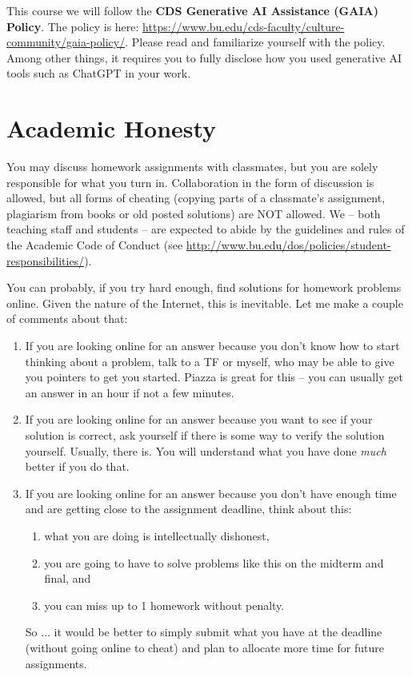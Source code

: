 \documentclass[11pt]{article}
\begin{document}
This course we will follow the \textbf{CDS Generative AI Assistance (GAIA) Policy}. The policy is here:
\url{https://www.bu.edu/cds-faculty/culture-community/gaia-policy/}.
Please read and familiarize yourself with the policy.  Among other
things, it requires you to fully disclose how you used generative AI
tools such as ChatGPT in your work. 

\section*{Academic Honesty}

You may discuss homework assignments with classmates, but you are 
solely responsible for what you turn in. Collaboration in the form of
discussion is allowed, but all forms of cheating (copying parts of a
classmate's assignment, plagiarism from books or old posted solutions)
are NOT allowed. We -- both teaching staff and students -- are expected
to abide by the guidelines and rules of the Academic Code of Conduct
(see
\url{http://www.bu.edu/dos/policies/student-responsibilities/}).

You can probably, if you try hard enough, find solutions for homework
problems online. Given the nature of the Internet, this is
inevitable. Let me make a couple of comments about that:
\begin{enumerate}
\item If you are looking online for an answer because you don't know how
  to start thinking about a problem, talk to a TF or myself, who may be
  able to give you pointers to get you started. Piazza is great for
  this -- you can usually get an answer in an hour if not a few minutes.
\item If you are looking online for an answer because you want to see if
  your solution is correct, ask yourself if there is some way to verify
  the solution yourself. Usually, there is. You will understand what you have done
  \emph{much} better if you do that.
\item If you are looking online for an answer because you don't have
  enough time and are getting close to the assignment deadline, think about this:
  \begin{enumerate}
  \item what you are doing is intellectually dishonest,
  \item you are going to have to solve problems like this on the midterm
    and final, and
  \item you can miss up to 1 homework without penalty.
  \end{enumerate}
So ... it would be better to simply submit what you have at the deadline
(without going online to cheat) and plan to allocate more time for
future assignments.
\end{enumerate}
\end{document}
